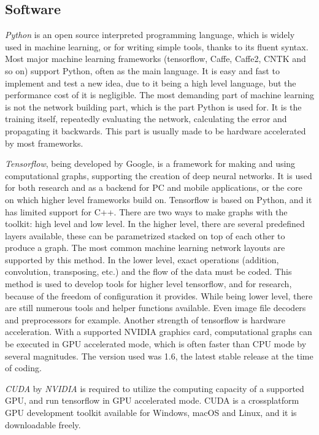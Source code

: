 \documentclass[12pt]{report}
\begin{document}
\subsection{Software}
\textit{Python} is an open source interpreted programming language, which is widely used in machine learning, or for writing simple tools, thanks to its fluent syntax. Most major machine learning frameworks (tensorflow, Caffe, Caffe2, CNTK and so on) support Python, often as the main language. It is easy and fast to implement and test a new idea, due to it being a high level language, but the performance cost of it is negligible. The most demanding part of machine learning is not the network building part, which is the part Python is used for. It is the training itself, repeatedly evaluating the network, calculating the error and propagating it backwards. This part is usually made to be hardware accelerated by most frameworks.

\textit{Tensorflow}, being developed by Google, is a framework for making and using computational graphs, supporting the creation of deep neural networks. It is used for both research and as a backend for PC and mobile applications, or the core on which higher level frameworks build on. Tensorflow is based on Python, and it has limited support for C++. There are two ways to make graphs with the toolkit: high level and low level. In the higher level, there are several predefined layers available, these can be parametrized stacked on top of each other to produce a graph. The most common machine learning network layouts are supported by this method. In the lower level, exact operations (addition, convolution, transposing, etc.) and the flow of the data must be coded. This method is used to develop tools for higher level tensorflow, and for research, because of the freedom of configuration it provides. While being lower level, there are still numerous tools and helper functions available. Even image file decoders and preprocessors for example. Another strength of tensorflow is hardware acceleration. With a supported NVIDIA graphics card, computational graphs can be executed in GPU accelerated mode, which is often faster than CPU mode by several magnitudes. The version used was 1.6, the latest stable release at the time of coding.

\textit{CUDA} by \textit{NVIDIA} is required to utilize the computing capacity of a supported GPU, and run tensorflow in GPU accelerated mode. CUDA is a crossplatform GPU development toolkit available for Windows, macOS and Linux, and it is downloadable freely.
\end{document}
